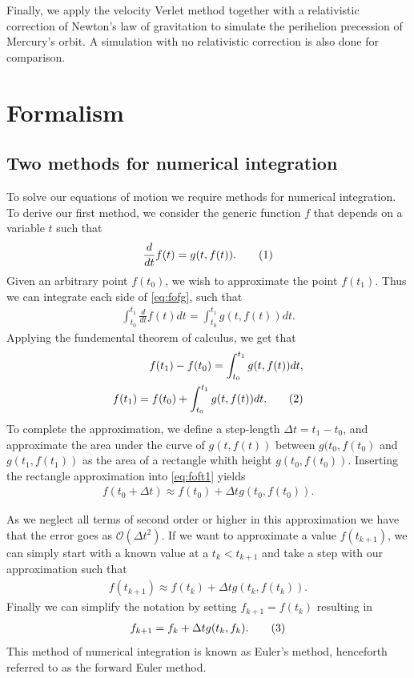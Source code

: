 \documentclass[reprint,english,notitlepage]{revtex4-1}  %
\newcommand\numberthis{\addtocounter{equation}{1}\tag{\theequation}}
\begin{document}
Finally, we apply the velocity Verlet method together with a relativistic correction of Newton's law of gravitation to simulate the perihelion precession of Mercury's orbit. A simulation with no relativistic correction is also done for comparison.

\section{Formalism} \label{sec:II}

\subsection{Two methods for numerical integration} \label{sec:II:a}
To solve our equations of motion we require methods for numerical integration. To derive our first method, we consider the generic function \(f\) that depends on a variable \(t\) such that
\begin{align*}
	\frac{d}{dt}f(t) = g(t, f(t)). \numberthis \label{eq:fofg}
\end{align*}
Given an arbitrary point \(f(t_{0})\), we wish to approximate the point \(f(t_{1})\). Thus we can integrate each side of \eqref{eq:fofg}, such that
\begin{align*}
	\int_{t_{0}}^{t_{1}} \frac{d}{dt} f(t) dt = \int_{t_{0}}^{t_{1}} g(t, f(t)) dt.
\end{align*}
Applying the fundemental theorem of calculus, we get that
\begin{align*}
	f(t_{1}) - f(t_{0}) = \int_{t_{0}}^{t_{1}} g(t, f(t)) dt, \\
	f(t_{1}) = f(t_{0}) + \int_{t_{0}}^{t_{1}} g(t, f(t)) dt. \numberthis \label{eq:foft1}
\end{align*}
To complete the approximation, we define a step-length \(\Delta t = t_{1}-t_{0}\), and approximate the area under the curve of \(g(t, f(t))\) between \(g(t_{0}, f(t_{0})\) and \(g(t_{1}, f(t_{1}))\) as the area of a rectangle whith height \(g(t_{0}, f(t_{0}))\). Inserting the rectangle approximation into \eqref{eq:foft1} yields
\begin{align*}
	f(t_{0} + \Delta t) \approx f(t_{0}) + \Delta t g(t_{0}, f(t_{0})).
\end{align*}

As we neglect all terms of second order or higher in this approximation we have that the error goes as $\mathcal{O}(\Delta t^2)$.
If we want to approximate a value \(f(t_{k+1})\), we can simply start with a known value at a \(t_{k} < t_{k+1}\) and take a step with our approximation such that
\begin{align*}
	f(t_{k+1}) \approx f(t_{k}) + \Delta t g(t_{k}, f(t_{k})).
\end{align*}
Finally we can simplify the notation by setting \(f_{k+1} = f(t_{k})\) resulting in
\begin{align*}
	f_{k+1} = f_{k} + \Delta t g(t_{k}, f_{k}). \numberthis \label{eq:forwardEuler}
\end{align*}
This method of numerical integration is known as Euler's method, henceforth referred to as the forward Euler method.
\end{document}
